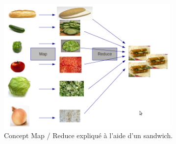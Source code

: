   \begin{figure}
    \centering
    \includegraphics[width=0.8\textwidth]{images/mapreduce.png}
    \caption{Concept Map / Reduce expliqué à l'aide d'un sandwich.}
    \label{mapreduce}
  \end{figure}
